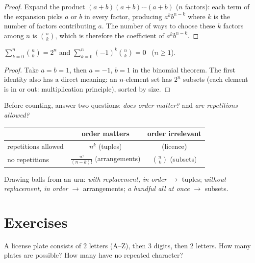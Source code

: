 \begin{proof}
Expand the product $(a+b)(a+b)\cdots(a+b)$ ($n$ factors): each term of the
expansion picks $a$ or $b$ in every factor, producing $a^k b^{n-k}$ where
$k$ is the number of factors contributing $a$. The number of ways to choose
these $k$ factors among $n$ is $\binom nk$, which is therefore the
coefficient of $a^k b^{n-k}$.
\end{proof}

\begin{corollary}\label{cor:tle:comb:sums}
$\displaystyle\sum_{k=0}^{n} \binom{n}{k} = 2^n$
\quad and \quad
$\displaystyle\sum_{k=0}^{n} (-1)^k\binom{n}{k} = 0$ \ ($n \geq 1$).
\end{corollary}

\begin{proof}
Take $a = b = 1$, then $a = -1$, $b = 1$ in the binomial theorem. The first
identity also has a direct meaning: an $n$-element set has $2^n$ subsets
(each element is in or out: multiplication principle), sorted by size.
\end{proof}

\begin{method}\label{met:tle:comb:model}
Before counting, answer two questions: \emph{does order matter?} and
\emph{are repetitions allowed?}
\begin{center}
\begin{tabular}{l|cc}
 & order matters & order irrelevant\\
\hline
repetitions allowed & $n^k$ (tuples) & (licence)\\
no repetitions & $\frac{n!}{(n-k)!}$ (arrangements) & $\binom nk$ (subsets)
\end{tabular}
\end{center}
Drawing balls from an urn: \emph{with replacement, in order} $\to$ tuples;
\emph{without replacement, in order} $\to$ arrangements; \emph{a handful all
at once} $\to$ subsets.
\end{method}

\section{Exercises}

\begin{exercise}[$\star$]\label{exo:tle:comb:1}
A license plate consists of 2 letters (A--Z), then 3 digits, then 2 letters.
How many plates are possible? How many have no repeated character?
\end{exercise}

